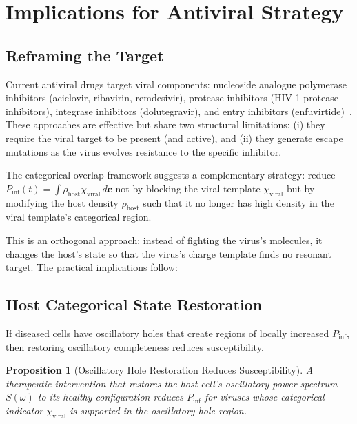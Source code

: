 \documentclass[11pt,twocolumn,a4paper]{article}
\newtheorem{proposition}[theorem]{Proposition}
\theoremstyle{definition}
\theoremstyle{remark}
\newcommand{\Phost}{\rho_{\mathrm{host}}}
\newcommand{\chiviral}{\chi_{\mathrm{viral}}}
\newcommand{\vv}[1]{\boldsymbol{#1}}
\begin{document}
\section{Implications for Antiviral Strategy}
\label{sec:antiviral}

\subsection{Reframing the Target}

Current antiviral drugs target viral components: nucleoside analogue polymerase inhibitors (aciclovir, ribavirin, remdesivir), protease inhibitors (HIV-1 protease inhibitors), integrase inhibitors (dolutegravir), and entry inhibitors (enfuvirtide)~\cite{Kaufmann2011}. These approaches are effective but share two structural limitations: (i) they require the viral target to be present (and active), and (ii) they generate escape mutations as the virus evolves resistance to the specific inhibitor.

The categorical overlap framework suggests a complementary strategy: reduce $P_{\mathrm{inf}}(t) = \int \Phost \chiviral\,d\vv{c}$ not by blocking the viral template $\chiviral$ but by modifying the host density $\Phost$ such that it no longer has high density in the viral template's categorical region.

This is an orthogonal approach: instead of fighting the virus's molecules, it changes the host's state so that the virus's charge template finds no resonant target. The practical implications follow:

\subsection{Host Categorical State Restoration}

If diseased cells have oscillatory holes that create regions of locally increased $P_{\mathrm{inf}}$, then restoring oscillatory completeness reduces susceptibility.

\begin{proposition}[Oscillatory Hole Restoration Reduces Susceptibility]
A therapeutic intervention that restores the host cell's oscillatory power spectrum $S(\omega)$ to its healthy configuration reduces $P_{\mathrm{inf}}$ for viruses whose categorical indicator $\chiviral$ is supported in the oscillatory hole region.
\end{proposition}
\end{document}
